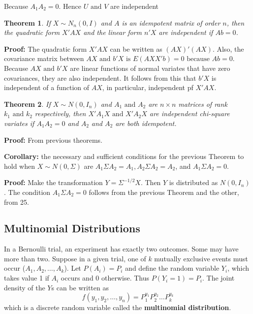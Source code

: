 \documentclass{article}
\newtheorem{theorem}{Theorem}[section]
\begin{document}
Because \(A_1A_2=0\). Hence \(U \text{ and } V\) are independent

\begin{theorem}
    If \(X\sim N_n(0,I)\) and \(A\) is an idempotent matrix of order \(n\), then the quadratic form \(X'AX\) and the linear form \(n'X\) are independent if \(Ab=0\).
\end{theorem}

\textbf{Proof:} The quadratic form \(X'AX\) can be written as \((AX)'(AX)\). Also, the covariance matrix between \(AX \text{ and } b'X \text{ is } E(AXX'b)=0 \text{ because } Ab=0\). Because \(AX \text{ and } b'X\) are linear functions of normal variates that have zero covariances, they are also independent. It follows from this that \(b'X\) is independent of a function of \(AX\), in particular, independent pf \(X'AX\).

\begin{theorem}
    If \(X\sim N(0,I_n)\) and \(A_1 \text{ and } A_2\) are \(n \times n\) matrices of rank \(k_1 \text{ and } k_2\) respectively, then \(X'A_1X \text{ and } X'A_2X\) are independent chi-square variates if \(A_1A_2=0\) and \(A_2\) and \(A_2\) are both idempotent.
\end{theorem}

\textbf{Proof:} From previous theorems.

\textbf{Corollary:} the necessary and sufficient conditions for the previous Theorem to hold when \(X\sim N(0,\Sigma)\) are \(A_1\Sigma A_2=A_1, A_2 \Sigma A_2=A_2\), and \(A_1\Sigma A_2=0\).

\textbf{Proof:} Make the transformation \(Y=\Sigma^{-1/2}X\). Then \(Y\) is distributed as \(N(0,I_n)\). The condition \(A_1 \Sigma A_2=0\) follows from the previous Theorem and the other, from 25.
\subsection{Multinomial Distributions}

In a Bernoulli trial, an experiment has exactly two outcomes. Some may have more than two. Suppose in a given trial, one of \(k\) mutually exclusive events must occur (\(A_1,A_2,\dots,A_k\)). Let \(P(A_i)=P_i\) and define the random variable \(Y_i\), which takes value 1 if \(A_i\) occurs and 0 otherwise. Thus \(P(Y_i=1)=P_i\). The joint density of the \(Y\)s can be written as
\begin{equation*}
    f(y_1,y_2,\dots,y_n)=P_1^{y_1}P_2^{y_2}\dots P_k^{y_k}
\end{equation*}
which is a discrete random variable called the \textbf{multinomial distribution}.
\end{document}
